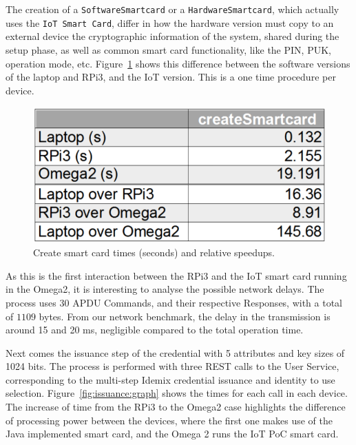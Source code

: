 The creation of a \texttt{SoftwareSmartcard} or a \texttt{HardwareSmartcard}, which actually uses the \texttt{IoT Smart Card}, differ in how the hardware version must copy to an external device the cryptographic information of the system, shared during the setup phase, as well as common smart card functionality, like the PIN, PUK, operation mode, etc. Figure~\ref{fig:createSmartCard:graph} shows this difference between the software versions of the laptop and RPi3, and the IoT version. This is a one time procedure per device.


\begin{figure}[bth]
	\begin{center} 
	\includegraphics[width=0.5\linewidth]{gfx/graphics/createSCtable}
	\end{center} 
	\caption{Create smart card times (seconds) and relative speedups.} 
	\label{fig:createSmartCard:graph} 
\end{figure}



As this is the first interaction between the RPi3 and the IoT smart card running in the Omega2, it is interesting to analyse the possible network delays. The process uses $30$ APDU Commands, and their respective Responses, with a total of $1109$ bytes. From our network benchmark, the delay in the transmission is around 15 and 20 ms, negligible compared to the total operation time.


\hfil

Next comes the issuance step of the credential with  5 attributes and key sizes of 1024 bits. The process is performed with three REST calls to the User Service, corresponding to the multi-step Idemix credential issuance and identity to use selection. Figure~\ref{fig:issuance:graph} shows the times for each call in each device. The increase of time from the RPi3 to the Omega2 case highlights the difference of processing power between the devices, where the first one makes use of the Java implemented smart card, and the Omega 2 runs the IoT PoC smart card.



